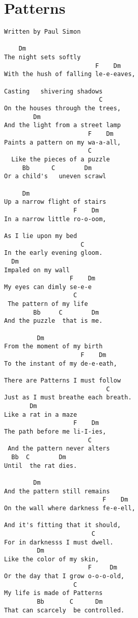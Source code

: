 \documentclass[leqno]{memoir}
\begin{document}
\chapter{Patterns}
\begin{verbatim}
Written by Paul Simon

    Dm          
The night sets softly
                         F    Dm     
With the hush of falling le-e-eaves,
                     
Casting   shivering shadows
                          C            
On the houses through the trees,
        Dm                  
And the light from a street lamp
                       F    Dm   
Paints a pattern on my wa-a-all,
                       C
  Like the pieces of a puzzle
     Bb      C        Dm           
Or a child's   uneven scrawl

     Dm                  
Up a narrow flight of stairs
                   F    Dm   
In a narrow little ro-o-oom,
                  
As I lie upon my bed
                     C            
In the early evening gloom.
  Dm                 
Impaled on my wall
                  F    Dm   
My eyes can dimly se-e-e
                   C
 The pattern of my life
        Bb     C        Dm        
And the puzzle  that is me.

         Dm              
From the moment of my birth
                     F    Dm    
To the instant of my de-e-eath,
                           
There are Patterns I must follow
                            C             
Just as I must breathe each breath.
       Dm             
Like a rat in a maze
                   F    Dm   
The path before me li-I-ies,
                       C
 And the pattern never alters
  Bb  C        Dm          
Until  the rat dies.

        Dm                  
And the pattern still remains
                           F    Dm    
On the wall where darkness fe-e-ell,
                          
And it's fitting that it should,
                        C            
For in darknesss I must dwell.
         Dm                
Like the color of my skin,
                       F     Dm   
Or the day that I grow o-o-o-old,
                   C
My life is made of Patterns
         Bb       C      Dm             
That can scarcely  be controlled.
\end{verbatim}
\newpage
\end{document}
